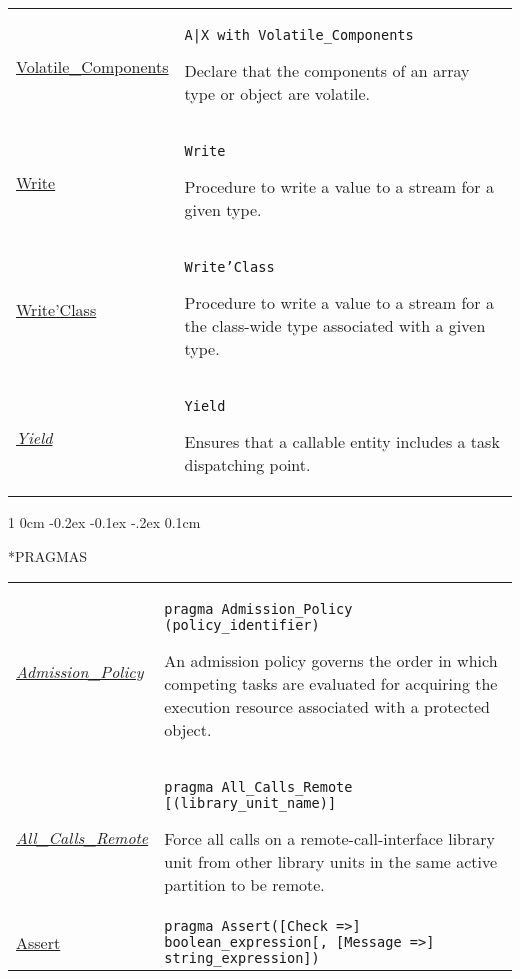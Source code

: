 \documentclass[english]{article}
\makeatletter
\renewcommand\section{%
   \@startsection{section}%
   {1}%
   {0cm}%
   {-0.2ex \@plus -0.1ex \@minus -.2ex}%
   {0.1cm}%
{\raggedright\normalfont\normalsize\bfseries}%
}
\makeatother
\begin{document}
\begin{scriptsize}
\begin{multicols*}{3}
\begin{tabular}{@{}p{2cm}p{6.5cm}}
   \href{http://www.ada-auth.org/standards/22rm/html/RM-C-6.html}{Volatile\_Components} & \texttt{A|X with Volatile\_Components}

   Declare that the components of an array type or object are volatile.\\

   \href{http://www.ada-auth.org/standards/22rm/html/RM-13-13-2.html}{Write} & \texttt{Write}

   Procedure to write a value to a stream for a given type.\\

   \href{http://www.ada-auth.org/standards/22rm/html/RM-13-13-2.html}{Write'Class} & \texttt{Write'Class}

   Procedure to write a value to a stream for a the class-wide type associated with a given type.\\

   \href{http://www.ada-auth.org/standards/22rm/html/RM-D-2-1.html}{\textit{Yield}} & \texttt{Yield}

   Ensures that a callable entity includes a task dispatching point.\\
\end{tabular}

\section*{PRAGMAS}
\begin{tabular}{@{}p{2cm}p{6.5cm}}

   \href{http://www.ada-auth.org/standards/22rm/html/RM-D-4-1.html}{\textit{Admission\_Policy}}  & \texttt{pragma Admission\_Policy (policy\_identifier)}

   An admission policy governs the order in which competing tasks are evaluated for acquiring the execution resource associated with a protected object.\\

   \href{http://www.ada-auth.org/standards/22rm/html/RM-J-15-15.html}{\textit{All\_Calls\_Remote}} & \texttt{pragma All\_Calls\_Remote [(library\_unit\_name)]}

   Force all calls on a remote-call-interface library unit from other library units in the same active partition to be remote.\\

   \href{http://www.ada-auth.org/standards/22rm/html/RM-11-4-2.html}{Assert} & \texttt{pragma Assert([Check =>] boolean\_expression[, [Message =>] string\_expression])}


\end{tabular}
\end{multicols*}
\end{scriptsize}
\end{document}
